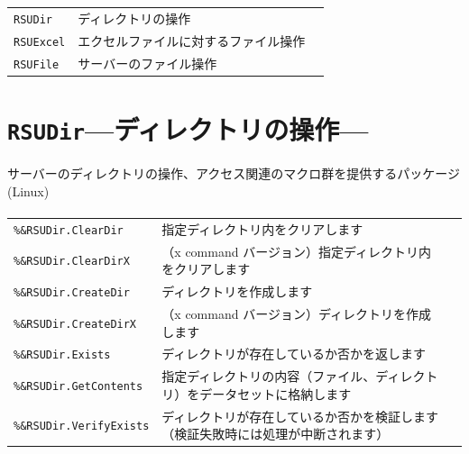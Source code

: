 \section{\DocStrTitlePackageListInCategory}
\begin{center}
\begin{xltabular}{\textwidth}{|p{2truecm}|X|p{2truecm}|}
\hline
\thead{\DocStrHeaderPackageName}&\thead{\DocStrHeaderPackagePurpose}&\thead{\DocStrRefto}\\
\hline
\hline
\texttt{RSUDir}&ディレクトリの操作&\\
\hline
\texttt{RSUExcel}&エクセルファイルに対するファイル操作&\\
\hline
\texttt{RSUFile}&サーバーのファイル操作&\\
\hline
\end{xltabular}
\end{center}
\section{\texttt{RSUDir}\;---\;ディレクトリの操作\;---}\label{sec:RSUDir}
サーバーのディレクトリの操作、アクセス関連のマクロ群を提供するパッケージ (Linux)
\paragraph{\DocStrTitleRDMPackageFunctionList}
\begin{center}
{\footnotesize
\begin{xltabular}{\textwidth}{|p{4truecm}|X|p{1.2truecm}|}
\hline
\thead{\DocStrHeaderFunctionName}&\thead{\DocStrDescription}&\thead{\DocStrRefto}\\
\hline
\hline
\texttt{\%\&RSUDir.ClearDir}&指定ディレクトリ内をクリアします&\\
\hline
\texttt{\%\&RSUDir.ClearDirX}&（x command バージョン）指定ディレクトリ内をクリアします&\\
\hline
\texttt{\%\&RSUDir.CreateDir}&ディレクトリを作成します&\\
\hline
\texttt{\%\&RSUDir.CreateDirX}&（x command バージョン）ディレクトリを作成します&\\
\hline
\texttt{\%\&RSUDir.Exists}&ディレクトリが存在しているか否かを返します&\\
\hline
\texttt{\%\&RSUDir.GetContents}&指定ディレクトリの内容（ファイル、ディレクトリ）をデータセットに格納します&\\
\hline
\texttt{\%\&RSUDir.VerifyExists}&ディレクトリが存在しているか否かを検証します（検証失敗時には処理が中断されます）&\\
\hline
\end{xltabular}
}
\end{center}
